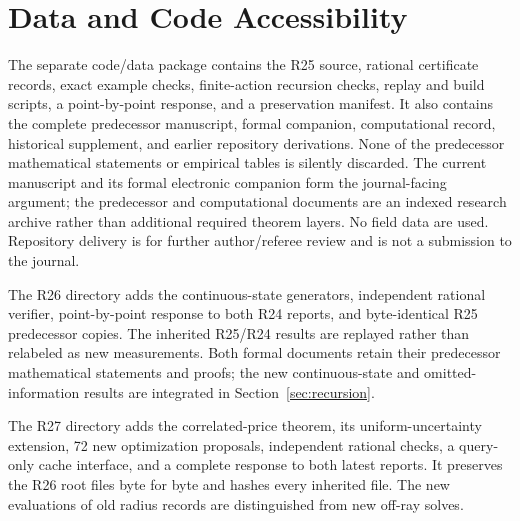 \documentclass[11pt,letterpaper]{article}
\theoremstyle{definition}\newtheorem{assumption}[theorem]{Assumption}
\begin{document}
\section*{Data and Code Accessibility}
The separate code/data package contains the R25 source, rational certificate records, exact example checks, finite-action recursion checks, replay and build scripts, a point-by-point response, and a preservation manifest. It also contains the complete predecessor manuscript, formal companion, computational record, historical supplement, and earlier repository derivations. None of the predecessor mathematical statements or empirical tables is silently discarded. The current manuscript and its formal electronic companion form the journal-facing argument; the predecessor and computational documents are an indexed research archive rather than additional required theorem layers. No field data are used. Repository delivery is for further author/referee review and is not a submission to the journal.

The R26 directory adds the continuous-state generators, independent rational verifier, point-by-point response to both R24 reports, and byte-identical R25 predecessor copies. The inherited R25/R24 results are replayed rather than relabeled as new measurements. Both formal documents retain their predecessor mathematical statements and proofs; the new continuous-state and omitted-information results are integrated in Section~\ref{sec:recursion}.

The R27 directory adds the correlated-price theorem, its uniform-uncertainty extension, 72 new optimization proposals, independent rational checks, a query-only cache interface, and a complete response to both latest reports. It preserves the R26 root files byte for byte and hashes every inherited file. The new evaluations of old radius records are distinguished from new off-ray solves.


\end{document}

